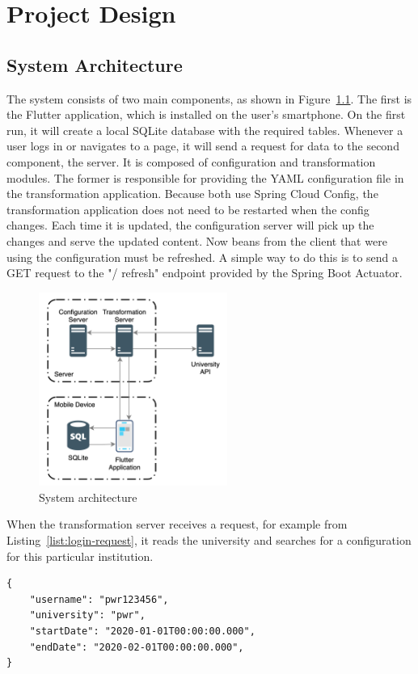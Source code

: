 \chapter{Project Design}
\section{System Architecture}

The system consists of two main components, as shown in Figure~\ref{fig:sys-architecture}. The first is the Flutter application, which is installed on the user's smartphone. On the first run, it will create a local SQLite database with the required tables. Whenever a user logs in or navigates to a page, it will send a request for data to the second component, the server. It is composed of configuration and transformation modules. The former is responsible for providing the YAML configuration file in the transformation application. Because both use Spring Cloud Config, the transformation application does not need to be restarted when the config changes. Each time it is updated, the configuration server will pick up the changes and serve the updated content. Now beans from the client that were using the configuration must be refreshed. A simple way to do this is to send a GET request to the "/ refresh" endpoint provided by the Spring Boot Actuator.

\begin{figure}[htb]
    \centering
    \includegraphics[width=0.55\textwidth]{fig03/system_architecture.png}
    \caption{System architecture}
    \label{fig:sys-architecture}
\end{figure}

When the transformation server receives a request, for example from Listing~\ref{list:login-request}, it reads the university and searches for a configuration for this particular institution.
\begin{lstlisting}[label=list:login-request,caption=Sample calendar request, basicstyle=\footnotesize\ttfamily]
{
    "username": "pwr123456",
    "university": "pwr",
    "startDate": "2020-01-01T00:00:00.000",
    "endDate": "2020-02-01T00:00:00.000",
}
\end{lstlisting}

